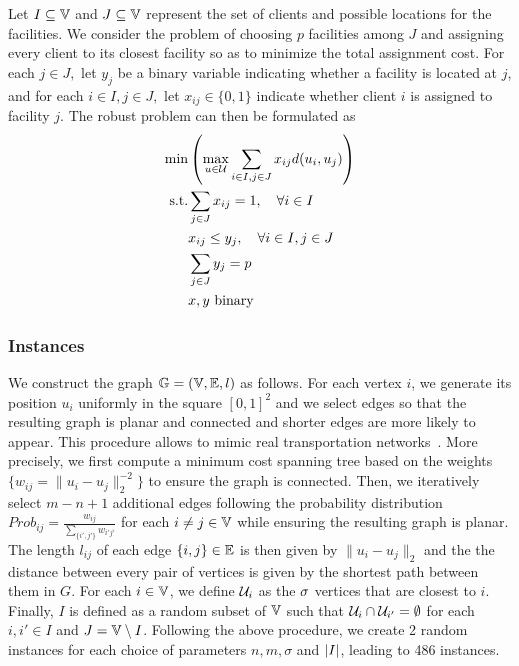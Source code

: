 \documentclass[12pt]{article}
\begin{document}
Let $I\subseteq \mathbb{V}$ and $J\subseteq \mathbb{V}$ represent the set of clients and possible locations for the facilities. %
We consider the problem of choosing $p$ facilities among $J$ and assigning every client to its closest facility so as to minimize the total assignment cost. For each $j\in J,$ let $y_j$ be a binary variable indicating whether a facility is located at $j$, and for each $i\in I, j\in J,$ let $x_{ij}\in\{0,1\}$ indicate whether client $i$ is assigned to facility $j$.
The robust problem can then be formulated as
\begin{align*}
\min &\left( \max_{u\in \mathcal{U}} \sum_{i\in I,j\in J}x_{ij}d(u_i,u_j) \right) \\
\mbox{s.t.}&\sum_{j\in J} x_{ij} = 1, \quad \forall i\in I \\
&x_{ij} \leq y_{j}, \quad \forall i\in I,j\in J \\
& \sum_{j\in J}y_j = p \\
&x,y\text{ binary}
\end{align*}

\subsubsection{Instances}

We construct the graph $\mathbb{G}=(\mathbb{V},\mathbb{E},l)$ as follows. For each vertex $i$, we generate its position $u_i$ uniformly in the square $[0,1]^2$ and we select edges so that the resulting graph is planar and connected and shorter edges are more likely to appear. 
This procedure allows to mimic real transportation networks~\citep{daskin1993genrand2}. 
More precisely, we first compute a minimum cost spanning tree based on the weights $\{w_{ij}=\|u_i-u_j\|_2^{-2}\}$ to ensure the graph is connected. Then, we iteratively select $m-n+1$ additional edges following the probability distribution $Prob_{ij}=\frac{w_{ij}}{\sum_{\{i',j'\}}w_{i'j'}}$ for each $i\neq j \in \mathbb{V}$ while ensuring the resulting graph is planar. The length $l_{ij}$ of each edge $\{i,j\}\in \mathbb{E}$ is then given by $\|u_i-u_j\|_2$ and the the distance between every pair of vertices is given by the shortest path between them in $G$. For each $i\in\mathbb{V}$, we define $\mathcal{U}_i$ as the $\sigma$ vertices that are closest to $i$. Finally, $I$ is defined as a random subset of $\mathbb{V}$ such that $\mathcal{U}_i\cap \mathcal{U}_{i'}=\emptyset$ for each $i,i'\in I$ and $J=\mathbb{V}\setminus I$. Following the above procedure, we create 2 random instances for each choice of parameters $n, m, \sigma$ and $\left\lvert I\right\rvert$, leading to 486 instances.
\end{document}
